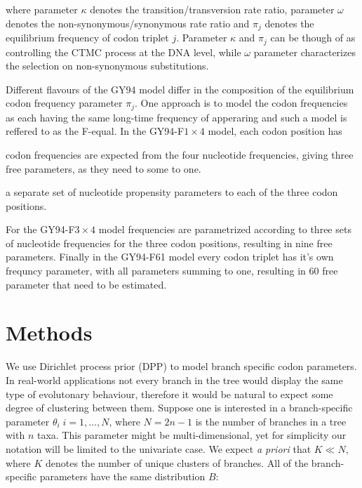 \noindent
where parameter $\kappa$ denotes the transition/transversion rate ratio, parameter $\omega$ denotes the non-synonymous/synonymous
rate ratio and $\pi_j$ denotes the equilibrium frequency of codon triplet $j$.
Parameter $\kappa$ and $\pi_j$ can be though of as controlling the CTMC process at the DNA level, while $\omega$ parameter characterizes the selection on non-synonymous substitutions.

Different flavours of the GY94 model differ in the composition of the equilibrium codon frequency parameter $\pi_{j}$.
One approach is to model the codon frequencies as each having the same long-time frequency of apperaring and such a model is reffered to as the F-equal.
In the GY94-F$1\times4$ model, each codon position has 


codon frequencies are expected from the four nucleotide frequencies, giving three free parameters, as they need to some to one.

a separate set of nucleotide propensity parameters to each of the three codon positions.



For the GY94-F$3\times4$ model frequencies are parametrized according to three sets of nucleotide frequencies for the three codon positions, resulting in nine free parameters.
Finally in the GY94-F61 model every codon triplet has it's own frequncy parameter, with all parameters summing to one, resulting in 60 free parameter that need to be estimated.




















\section{Methods}

We use Dirichlet process prior (DPP) to model branch specific codon parameters.
In real-world applications not every branch in the tree would display the same type of evolutonary behaviour, therefore it would be natural to expect some degree of clustering between them.
Suppose one is interested in a branch-specific parameter $\theta_{i}\;i=1,\ldots,N$, where $N=2n-1$ is the number of branches in a tree with $n$ taxa. 
This parameter might be multi-dimensional, yet for simplicity our notation will be limited to the univariate case.
We expect \emph{a priori} that $K\ll N$, where $K$ denotes the number of unique clusters of branches.
All of the branch-specific parameters have the same distribution $B$:

